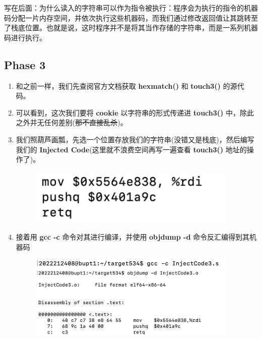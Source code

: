     \par 写在后面：为什么读入的字符串可以作为指令被执行：程序会为执行的指令的机器码分配一片内存空间，并依次执行这些机器码，而我们通过修改返回值让其跳转至了栈底位置。也就是说，这时程序并不是将其当作存储的字符串，而是一系列机器码进行执行。

    \subsection{Phase 3}
        \begin{enumerate}
            \item 和之前一样，我们先查阅官方文档获取 \textbf{hexmatch()} 和 \textbf{touch3()} 的源代码。
                
            \item 可以看到，这次我们要将 \textbf{cookie} 以字符串的形式传递进 \textbf{touch3()} 中，除此之外并无任何差别(\sout{那不直接乱杀})。
            \item 我们照葫芦画瓢，先选一个位置存放我们的字符串(没错又是栈底)，然后编写我们的 \textbf{Injected Code}(这里就不浪费空间再写一遍查看 \textbf{touch3()} 地址的操作了)。
                \begin{figure}[htbp]
                    \includegraphics*[width = 10cm]{s3_0.png}
                \end{figure}
            \item 接着用 \textbf{gcc -c} 命令对其进行编译，并使用 \textbf{objdump -d} 命令反汇编得到其机器码
                \begin{figure}[htbp]
                    \includegraphics*[width = 10cm]{s3_1.png} \\
                    \includegraphics*[width = 10cm]{s3_2.png}
                \end{figure}

\end{enumerate}
